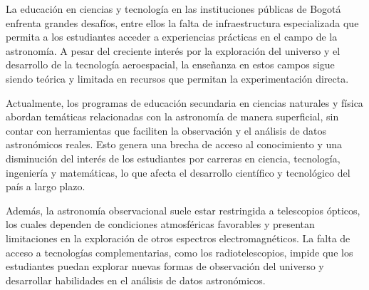 La educación en ciencias y tecnología en las instituciones públicas de Bogotá
enfrenta grandes desafíos, entre ellos la falta de infraestructura
especializada que permita a los estudiantes acceder a experiencias prácticas en
el campo de la astronomía.
A pesar del creciente interés por la exploración del universo y el desarrollo de
la tecnología aeroespacial, la enseñanza en estos campos sigue siendo teórica y
limitada en recursos que permitan la experimentación directa.

Actualmente, los programas de educación secundaria en ciencias naturales y
física abordan temáticas relacionadas con la astronomía de manera superficial,
sin contar con herramientas que faciliten la observación y el análisis de datos
astronómicos reales.
Esto genera una brecha de acceso al conocimiento y una disminución del interés
de los estudiantes por carreras en ciencia, tecnología, ingeniería y matemáticas,
lo que afecta el desarrollo científico y tecnológico del país a largo plazo.

Además, la astronomía observacional suele estar restringida a telescopios
ópticos, los cuales dependen de condiciones atmosféricas favorables y presentan
limitaciones en la exploración de otros espectros electromagnéticos.
La falta de acceso a tecnologías complementarias, como los radiotelescopios,
impide que los estudiantes puedan explorar nuevas formas de observación del
universo y desarrollar habilidades en el análisis de datos astronómicos.
